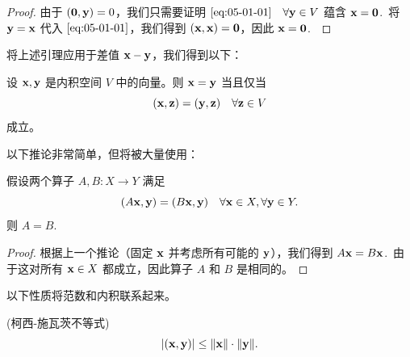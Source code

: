 \begin{proof}由于 $(\mathbf{0}, \mathbf{y}) = 0$，我们只需要证明 $\eqref{eq:05-01-01} \quad \forall \mathbf{y} \in V$ 蕴含 $\mathbf{x} = \mathbf{0}$.~将 $\mathbf{y} = \mathbf{x}$ 代入 $\eqref{eq:05-01-01}$，我们得到 $(\mathbf{x}, \mathbf{x}) = \mathbf{0}$，因此 $\mathbf{x} = \mathbf{0}$.~\end{proof}

将上述引理应用于差值 $\mathbf{x} - \mathbf{y}$，我们得到以下：

\begin{corollary}\label{stmt:05-01-05}
设 $\mathbf{x}, \mathbf{y}$ 是内积空间 $V$ 中的向量。则 $\mathbf{x} = \mathbf{y}$ 当且仅当
$$(\mathbf{x}, \mathbf{z}) = (\mathbf{y}, \mathbf{z}) \quad \forall \mathbf{z} \in V$$ 成立。
\end{corollary}

以下推论非常简单，但将被大量使用：

\begin{corollary}\label{stmt:05-01-06}
假设两个算子 $A, B: X \to Y$ 满足
$$(A\mathbf{x}, \mathbf{y}) = (B\mathbf{x}, \mathbf{y}) \quad \forall \mathbf{x} \in X, \forall \mathbf{y} \in Y.$$
则 $A = B$.
\end{corollary}

\begin{proof}根据上一个推论（固定 $\mathbf{x}$ 并考虑所有可能的 $\mathbf{y}$），我们得到 $A\mathbf{x} = B\mathbf{x}$.~由于这对所有 $\mathbf{x} \in X$ 都成立，因此算子 $A$ 和 $B$ 是相同的。\end{proof}

以下性质将范数和内积联系起来。

\begin{theorem}\label{stmt:05-01-07}  (柯西-施瓦茨不等式)
$$|(\mathbf{x}, \mathbf{y})| \le \|\mathbf{x}\| \cdot \|\mathbf{y}\|.$$\end{theorem}

